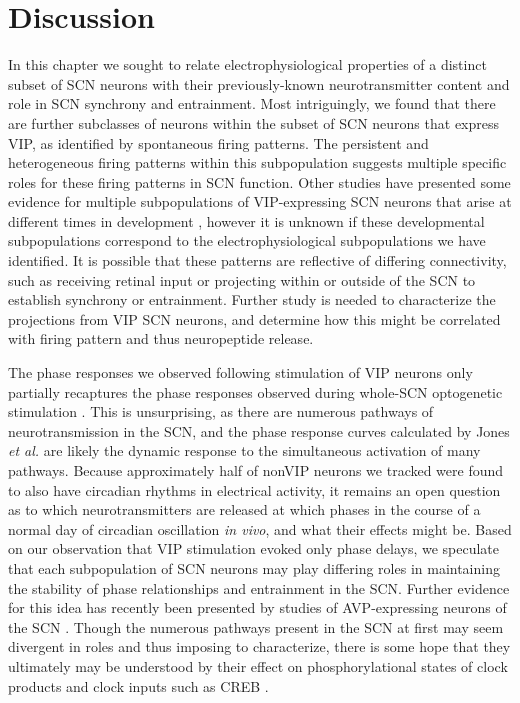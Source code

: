 \clearpage
\section{Discussion}
In this chapter we sought to relate electrophysiological properties of a distinct subset of SCN neurons with their previously-known neurotransmitter content and role in SCN synchrony and entrainment.
Most intriguingly, we found that there are further subclasses of neurons within the subset of SCN neurons that express VIP, as identified by spontaneous firing patterns.
The persistent and heterogeneous firing patterns within this subpopulation suggests multiple specific roles for these firing patterns in SCN function.
Other studies have presented some evidence for multiple subpopulations of VIP-expressing SCN neurons that arise at different times in development \cite{Ban1997}, however it is unknown if these developmental subpopulations correspond to the electrophysiological subpopulations we have identified.
It is possible that these patterns are reflective of differing connectivity, such as receiving retinal input or projecting within or outside of the SCN to establish synchrony or entrainment.
Further study is needed to characterize the projections from VIP SCN neurons, and determine how this might be correlated with firing pattern and thus neuropeptide release.

The phase responses we observed following stimulation of VIP neurons only partially recaptures the phase responses observed during whole-SCN optogenetic stimulation \cite{Jones2015}.
This is unsurprising, as there are numerous pathways of neurotransmission in the SCN, and the phase response curves calculated by Jones \textit{et al.} are likely the dynamic response to the simultaneous activation of many pathways.
Because approximately half of nonVIP neurons we tracked were found to also have circadian rhythms in electrical activity, it remains an open question as to which neurotransmitters are released at which phases in the course of a normal day of circadian oscillation \textit{in vivo}, and what their effects might be.
Based on our observation that VIP stimulation evoked only phase delays, we speculate that each subpopulation of SCN neurons may play differing roles in maintaining the stability of phase relationships and entrainment in the SCN.
Further evidence for this idea has recently been presented by studies of AVP-expressing neurons of the SCN \cite{Mieda2015}.
Though the numerous pathways present in the SCN at first may seem divergent in roles and thus imposing to characterize, there is some hope that they ultimately may be understood by their effect on phosphorylational states of clock products and clock inputs such as CREB \cite{Herzog2017, Aton2006, Bedont2015, Bieler2014, Liu2007a, Maywood2007}.


